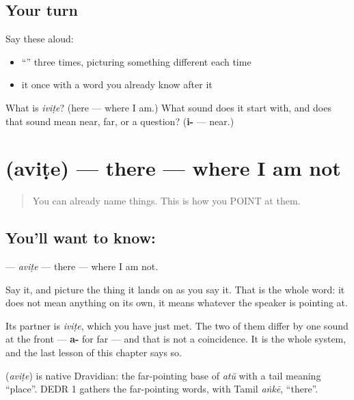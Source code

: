 \subsection*{Your turn}
Say these aloud:

\begin{itemize}
\raggedright
  \item \textquotedblleft{}\textquotedblright{} three times, picturing something different each time
  \item it once with a word you already know after it
\end{itemize}

\begin{tcolorbox}[breakable,colback=teal!4,colframe=teal!35!black,title={Before you move on}]
What is \emph{iviṭe}? (here — where I am.) What sound does it start with, and does that sound mean near, far, or a question? (\textbf{i-} — near.)
\end{tcolorbox}
\section[\texorpdfstring{\ml{അവിടെ} (aviṭe)}{അവിടെ (aviṭe)}]{ (aviṭe) — there — where I am not}

\label{lesson:ML-C41-there}



\begin{quote}
You can already name things. This is how you POINT at them.
\end{quote}

\subsection*{You'll want to know: }
\textbf{} — \emph{aviṭe} — there — where I am not.

Say it, and picture the thing it lands on as you say it. That is the whole word: it does not mean anything on its own, it means whatever the speaker is pointing at.

Its partner is \textbf{} \emph{iviṭe}, which you have just met. The two of them differ by one sound at the front — \textbf{a-} for far — and that is not a coincidence. It is the whole system, and the last lesson of this chapter says so.

\begin{cousinweb}
\textbf{} (\emph{aviṭe}) is native Dravidian: the far-pointing base of \emph{atŭ} with a tail meaning \textquotedblleft{}place\textquotedblright{}. DEDR 1 gathers the far-pointing words, with Tamil \emph{aṅkē}, \textquotedblleft{}there\textquotedblright{}.
\end{cousinweb}

